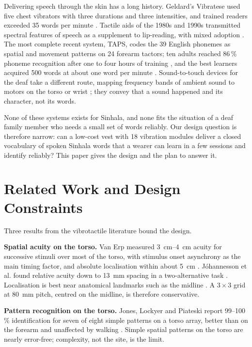 \documentclass[conference]{IEEEtran}
\begin{document}
Delivering speech through the skin has a long history. Geldard's Vibratese used five chest vibrators with three durations and three intensities, and trained readers exceeded 35 words per minute \cite{geldard1957}. Tactile aids of the 1980s and 1990s transmitted spectral features of speech as a supplement to lip-reading, with mixed adoption \cite{summers1992}. The most complete recent system, TAPS, codes the 39 English phonemes as spatial and movement patterns on 24 forearm tactors; ten adults reached 86\,\% phoneme recognition after one to four hours of training \cite{reed2019}, and the best learners acquired 500 words at about one word per minute \cite{tan2020}. Sound-to-touch devices for the deaf take a different route, mapping frequency bands of ambient sound to motors on the torso or wrist \cite{novich2015,perrotta2021}; they convey that a sound happened and its character, not its words.

None of these systems exists for Sinhala, and none fits the situation of a deaf family member who needs a small set of words reliably. Our design question is therefore narrow: can a low-cost vest with 18 vibration modules deliver a closed vocabulary of spoken Sinhala words that a wearer can learn in a few sessions and identify reliably? This paper gives the design and the plan to answer it.

\section{Related Work and Design Constraints}
Three results from the vibrotactile literature bound the design.

\textbf{Spatial acuity on the torso.} Van Erp measured \SIrange{3}{4}{cm} acuity for successive stimuli over most of the torso, with stimulus onset asynchrony as the main timing factor, and absolute localisation within about \SI{5}{cm} \cite{vanerp2005acuity,vanerp2005directions}. J{\'o}hannesson et al. found relative acuity down to \SI{13}{mm} spacing in a two-alternative task \cite{johannesson2017}. Localisation is best near anatomical landmarks such as the midline \cite{cholewiak2004}. A $3\times3$ grid at \SI{80}{mm} pitch, centred on the midline, is therefore conservative.

\textbf{Pattern recognition on the torso.} Jones, Lockyer and Piateski report 99--100\,\% identification for seven of eight simple patterns on a torso array, better than on the forearm and unaffected by walking \cite{jones2006}. Simple spatial patterns on the torso are nearly error-free; complexity, not the site, is the limit.
\end{document}
